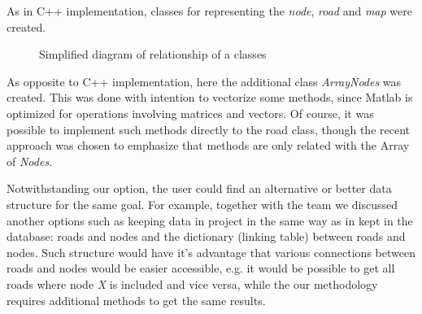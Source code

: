 \documentclass{article}
\begin{document}
As in C++ implementation, classes for representing the \textit{node}, \textit{road} and \textit{map} were created.

\begin{figure}[!h]
\centering
{}
\caption{Simplified diagram of relationship of a classes}
\end{figure}

As opposite to C++ implementation, here the additional class \textit{ArrayNodes} was created. This was done with intention to vectorize some methods, since Matlab is optimized for operations involving matrices and vectors. Of course, it was possible to implement such methods directly to the road class, though the recent approach was chosen to emphasize that methods are only related with the Array of \textit{Nodes}.

Notwithstanding our option, the user could find an alternative or better data structure for the same goal.
For example, together with the team we discussed another options such as keeping data in project in the same way as in kept in the database: roads and nodes and the dictionary (linking table) between roads and nodes. Such structure would have it's advantage that various connections between roads and nodes would be easier accessible, e.g. it would be possible to get all roads where node \textit{X} is included and vice versa, while the our methodology requires additional methods to get the same results. 

\end{document}
